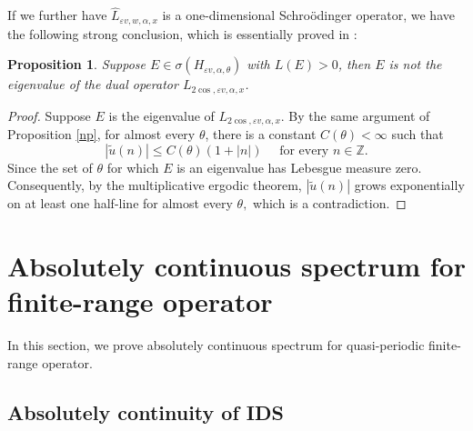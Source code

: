 \documentclass[11pt]{amsart}
\newtheorem{proposition}[theorem]{Proposition}
\theoremstyle{remark}
\theoremstyle{definition}
\begin{document}
If we further have $\hat{L}_{\varepsilon v,w,\alpha,x}$ is a one-dimensional Schro\"odinger operator, we have the following strong conclusion, which is essentially proved in \cite{De}:
\begin{proposition}\label{apoint}
    Suppose $E\in \sigma(H_{\varepsilon v,\alpha,\theta})$ with $L(E)>0$, then $E$ is not the eigenvalue of  the dual operator ${L}_{2\cos,\varepsilon v,\alpha,x}$.
\end{proposition}
\begin{proof}
    Suppose  $E$ is the eigenvalue of ${L}_{2\cos,\varepsilon v,\alpha,x}$. By the same argument of Proposition \ref{np}, for almost every $\theta$, there is a constant $C(\theta)<\infty$ such that
$$
|\tilde{u}(n)| \leq C(\theta)(1+|n|) \quad \text { for every } n \in \mathbb{Z}.
$$
Since the set of $\theta$ for which $E$ is an eigenvalue has Lebesgue measure zero. Consequently, by the multiplicative ergodic theorem, $|\tilde{u}(n)|$ grows exponentially on at least one half-line for almost every $\theta,$ which is a contradiction.
\end{proof}




\section{Absolutely continuous spectrum for finite-range operator}\label{proof-finite}
 In this section, we prove 
absolutely continuous spectrum for quasi-periodic finite-range operator.		

\subsection{Absolutely continuity of IDS}
\end{document}
